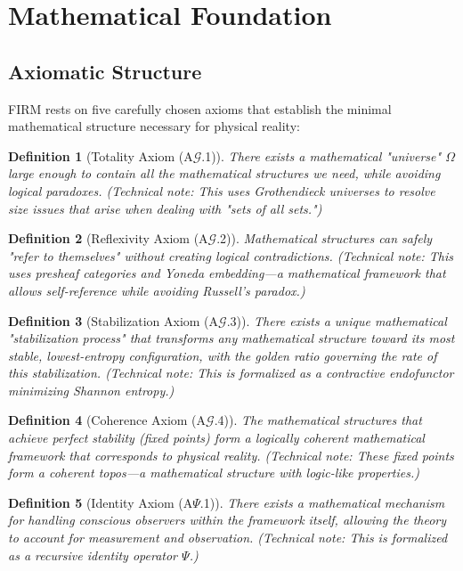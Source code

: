 \documentclass[12pt]{article}
\newcommand{\IdentityOp}{\Psi}              %
\newtheorem{definition}{Definition}
\begin{document}
\section{Mathematical Foundation}

\subsection{Axiomatic Structure}

FIRM rests on five carefully chosen axioms that establish the minimal mathematical structure necessary for physical reality:

\begin{definition}[Totality Axiom (A$\mathcal{G}$.1)]
There exists a mathematical "universe" $\Omega$ large enough to contain all the mathematical structures we need, while avoiding logical paradoxes. (Technical note: This uses Grothendieck universes to resolve size issues that arise when dealing with "sets of all sets.")
\end{definition}

\begin{definition}[Reflexivity Axiom (A$\mathcal{G}$.2)]  
Mathematical structures can safely "refer to themselves" without creating logical contradictions. (Technical note: This uses presheaf categories and Yoneda embedding—a mathematical framework that allows self-reference while avoiding Russell's paradox.)
\end{definition}

\begin{definition}[Stabilization Axiom (A$\mathcal{G}$.3)]
There exists a unique mathematical "stabilization process" that transforms any mathematical structure toward its most stable, lowest-entropy configuration, with the golden ratio governing the rate of this stabilization. (Technical note: This is formalized as a contractive endofunctor minimizing Shannon entropy.)
\end{definition}

\begin{definition}[Coherence Axiom (A$\mathcal{G}$.4)]
The mathematical structures that achieve perfect stability (fixed points) form a logically coherent mathematical framework that corresponds to physical reality. (Technical note: These fixed points form a coherent topos—a mathematical structure with logic-like properties.)
\end{definition}

\begin{definition}[Identity Axiom (A$\IdentityOp$.1)]
There exists a mathematical mechanism for handling conscious observers within the framework itself, allowing the theory to account for measurement and observation. (Technical note: This is formalized as a recursive identity operator $\IdentityOp$.)
\end{definition}
\end{document}
